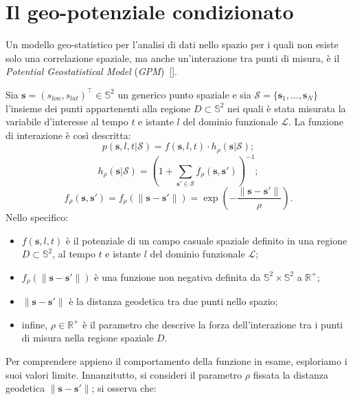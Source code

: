 \section[Il geo-potenziale condizionato]{Il geo-potenziale condizionato}
Un modello geo-statistico per l'analisi di dati nello spazio per i quali non esiste solo una correlazione spaziale, ma anche un'interazione tra punti di misura, è il \textit{Potential Geostatistical Model} (\textit{GPM})~[\cite{paper_GPM}].
\par Sia $\mathbf{s} = (s_{lon}, s_{lat})^\top\in\mathbb{S}^2$ un generico punto spaziale e sia $\mathcal{S} = \{\mathbf{s}_1, \ldots, \mathbf{s}_ N\}$ l'insieme dei punti appartenenti alla regione $D\subset\mathbb{S}^2$ nei quali è stata misurata la variabile d'interesse al tempo $t$ e istante $l$ del dominio funzionale $\mathcal{L}$. La funzione di interazione è così descritta:
\begin{equation}
	p(\mathbf{s}, l, t| \mathcal{S}) = f(\mathbf{s}, l, t) \cdot h_\rho(\mathbf{s}| \mathcal{S});
	\label{funzione di interazione}
\end{equation}
\begin{equation}
	h_\rho(\mathbf{s}|\mathcal{S}) = \left(1 + \sum_{\mathbf{s}' \in \mathcal{S}} f_\rho(\mathbf{s}, \mathbf{s}')\right)^{-1};
	\label{funzione di interazione_2}
\end{equation}
\begin{equation}
	f_\rho(\mathbf{s}, \mathbf{s}') = f_\rho(\|\mathbf{s} - \mathbf{s}'\|) = \exp\left(-\frac{{\|\mathbf{s} - \mathbf{s}'\|}}{{\rho}}\right).
	\label{nonnegative binary function}
\end{equation}
Nello specifico:
\begin{itemize}
	\item $f(\mathbf{s}, l, t)$ è il potenziale di un campo casuale spaziale definito in una regione  $D \subset \mathbb{S}^2$, al tempo $t$ e istante $l$ del dominio funzionale $\mathcal{L}$;
	\item $f_\rho(\|\mathbf{s} - \mathbf{s}'\|)$ è una funzione non negativa definita da $\mathbb{S}^2\times\mathbb{S}^2$ a $\mathbb{R}^+$;
	\item $\|\mathbf{s} - \mathbf{s}'\|$ è la distanza geodetica tra due punti nello spazio;
	\item infine, $\rho \in \mathbb{R}^+$ è il parametro che descrive la forza dell'interazione tra i punti di misura nella regione spaziale $D$.
\end{itemize}
Per comprendere appieno il comportamento della funzione in esame, esploriamo i suoi valori limite. Innanzitutto, si consideri il parametro $\rho$ fissata la distanza geodetica $\|\mathbf{s} - \mathbf{s}'\|$; si osserva che:
